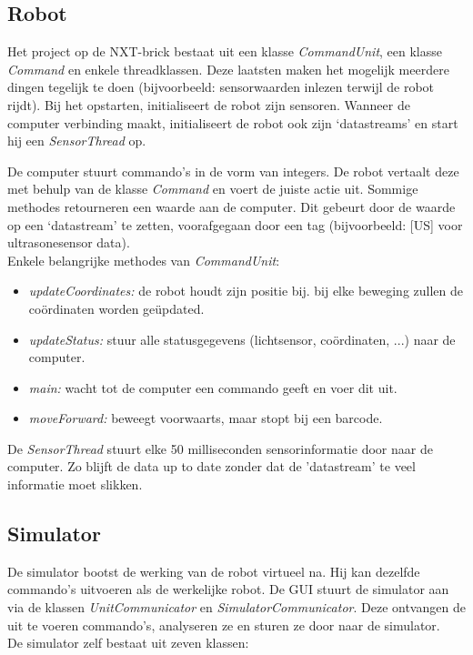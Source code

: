 \documentclass[tt3]{penoverslag}
\begin{document}
\subsection{Robot} %
\label{ssec:robot}
Het project op de NXT-brick bestaat uit een klasse \textit{CommandUnit}, een klasse \textit{Command} en enkele threadklassen. Deze laatsten maken het mogelijk meerdere dingen tegelijk te doen (bijvoorbeeld: sensorwaarden inlezen terwijl de robot rijdt). Bij het opstarten, initialiseert de robot zijn sensoren. Wanneer de computer verbinding maakt, initialiseert de robot ook zijn `datastreams' en start hij een \textit{SensorThread} op.

De computer stuurt commando's in de vorm van integers. De robot vertaalt deze met behulp van de klasse \textit{Command} en voert de juiste actie uit. Sommige methodes retourneren een waarde aan de computer. Dit gebeurt door de waarde op een `datastream' te zetten, voorafgegaan door een tag (bijvoorbeeld: [US] voor ultrasonesensor data).\\

Enkele belangrijke methodes van \textit{CommandUnit}:
\begin{itemize}
\item \textit{updateCoordinates:} de robot houdt zijn positie bij. bij elke beweging zullen de co\"ordinaten worden ge\"updated.
\item \textit{updateStatus:} stuur alle statusgegevens (lichtsensor, co\"ordinaten, ...) naar de computer.
\item \textit{main:} wacht tot de computer een commando geeft en voer dit uit.
\item \textit{moveForward:} beweegt voorwaarts, maar stopt bij een barcode.
\end{itemize}

De \textit{SensorThread} stuurt elke 50 milliseconden sensorinformatie door naar de computer. Zo blijft de data up to date zonder dat de 'datastream' te veel informatie moet slikken.

\subsection{Simulator} %
\label{ssec:simulator}
De simulator bootst de werking van de robot virtueel na. Hij kan dezelfde commando's uitvoeren als de werkelijke robot. De GUI stuurt de simulator aan via de klassen \textit{UnitCommunicator} en \textit{SimulatorCommunicator}. Deze ontvangen de uit te voeren commando's, analyseren ze en sturen ze door naar de simulator.
\\
De simulator zelf bestaat uit zeven klassen:
\end{document}
